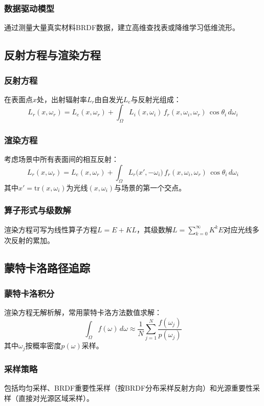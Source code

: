 \documentclass[12pt]{article}
\begin{document}
\subsubsection*{数据驱动模型}
通过测量大量真实材料BRDF数据，建立高维查找表或降维学习低维流形。

\subsection{反射方程与渲染方程}

\subsubsection{反射方程}
在表面点$x$处，出射辐射率$L_r$由自发光$L_e$与反射光组成：
\[
L_r(x, \omega_r) = L_e(x, \omega_r) + \int_{\Omega} L_i(x, \omega_i) \, f_r(x, \omega_i, \omega_r) \, \cos\theta_i \, d\omega_i
\]

\subsubsection{渲染方程}
考虑场景中所有表面间的相互反射：
\[
L_r(x, \omega_r) = L_e(x, \omega_r) + \int_{\Omega} L_r\big( x', -\omega_i \big) \, f_r(x, \omega_i, \omega_r) \, \cos\theta_i \, d\omega_i
\]
其中$x' = \text{tr}(x, \omega_i)$为光线$(x, \omega_i)$与场景的第一个交点。

\subsubsection{算子形式与级数解}
渲染方程可写为线性算子方程$L = E + K L$，其级数解$L = \sum_{k=0}^{\infty} K^k E$对应光线多次反射的累加。

\subsection{蒙特卡洛路径追踪}

\subsubsection{蒙特卡洛积分}
渲染方程无解析解，常用蒙特卡洛方法数值求解：
\[
\int_{\Omega} f(\omega) \, d\omega \approx \frac{1}{N} \sum_{j=1}^N \frac{f(\omega_j)}{p(\omega_j)}
\]
其中$\omega_j$按概率密度$p(\omega)$采样。

\subsubsection{采样策略}
包括均匀采样、BRDF重要性采样（按BRDF分布采样反射方向）和光源重要性采样（直接对光源区域采样）。
\end{document}

